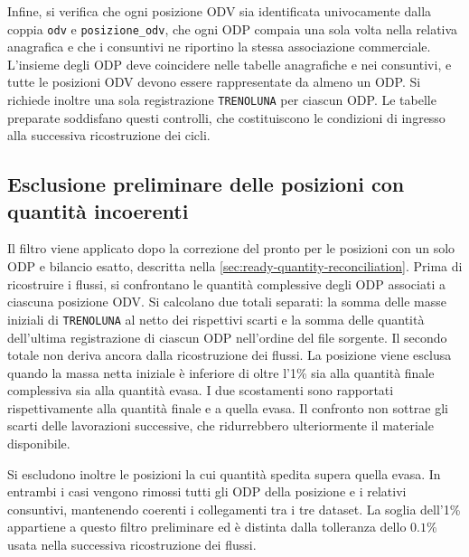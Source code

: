 Infine, si verifica che ogni posizione ODV sia identificata univocamente dalla coppia \texttt{odv} e \texttt{posizione\_odv}, che ogni ODP compaia una sola volta nella relativa anagrafica e che i consuntivi ne riportino la stessa associazione commerciale. L'insieme degli ODP deve coincidere nelle tabelle anagrafiche e nei consuntivi, e tutte le posizioni ODV devono essere rappresentate da almeno un ODP. Si richiede inoltre una sola registrazione \texttt{TRENOLUNA} per ciascun ODP. Le tabelle preparate soddisfano questi controlli, che costituiscono le condizioni di ingresso alla successiva ricostruzione dei cicli.

\subsection{Esclusione preliminare delle posizioni con quantità incoerenti}
\label{sec:preliminary-mass-exclusions}

Il filtro viene applicato dopo la correzione del pronto per le posizioni con un solo ODP e bilancio esatto, descritta nella \cref{sec:ready-quantity-reconciliation}. Prima di ricostruire i flussi, si confrontano le quantità complessive degli ODP associati a ciascuna posizione ODV. Si calcolano due totali separati: la somma delle masse iniziali di \texttt{TRENOLUNA} al netto dei rispettivi scarti e la somma delle quantità dell'ultima registrazione di ciascun ODP nell'ordine del file sorgente. Il secondo totale non deriva ancora dalla ricostruzione dei flussi. La posizione viene esclusa quando la massa netta iniziale è inferiore di oltre l'1\% sia alla quantità finale complessiva sia alla quantità evasa. I due scostamenti sono rapportati rispettivamente alla quantità finale e a quella evasa. Il confronto non sottrae gli scarti delle lavorazioni successive, che ridurrebbero ulteriormente il materiale disponibile.

Si escludono inoltre le posizioni la cui quantità spedita supera quella evasa. In entrambi i casi vengono rimossi tutti gli ODP della posizione e i relativi consuntivi, mantenendo coerenti i collegamenti tra i tre dataset. La soglia dell'1\% appartiene a questo filtro preliminare ed è distinta dalla tolleranza dello $0.1\%$ usata nella successiva ricostruzione dei flussi.

